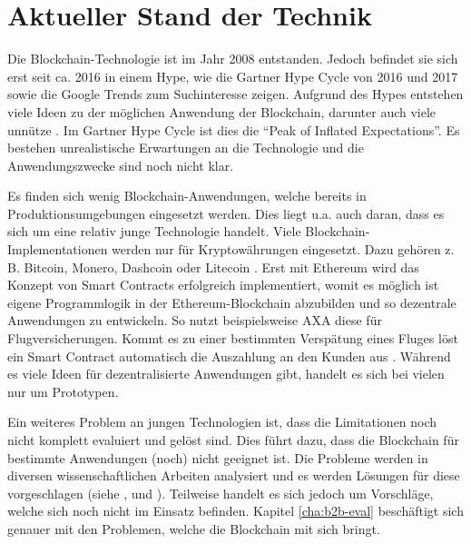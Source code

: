 \chapter{Aktueller Stand der Technik}
\label{cha:stand-technik}

Die Blockchain-Technologie ist im Jahr 2008 entstanden. Jedoch befindet sie sich erst seit ca. 2016 in einem Hype, wie die Gartner Hype Cycle von 2016 und 2017 \cite{PanettaTopTrendsGartner2017}\cite{AmyGartner2016Hype2016} sowie die Google Trends zum Suchinteresse \cite{GoogleBlockchainGoogleTrends18} zeigen. Aufgrund des Hypes entstehen viele Ideen zu der möglichen Anwendung der Blockchain, darunter auch viele unnütze \cite{WustyouneedBlockchain2017}. Im Gartner Hype Cycle ist dies die ``Peak of Inflated Expectations''. Es bestehen unrealistische Erwartungen an die Technologie und die Anwendungszwecke sind noch nicht klar. 

Es finden sich wenig Blockchain-Anwendungen, welche bereits in Produktionsumgebungen eingesetzt werden. Dies liegt u.a. auch daran, dass es sich um eine relativ junge Technologie handelt. Viele Blockchain-Implementationen werden nur für Kryptowährungen eingesetzt. Dazu gehören z. B. Bitcoin, Monero, Dashcoin oder Litecoin \cite{BlockchainHubBlockchainsDistributedLedger}. Erst mit Ethereum wird das Konzept von Smart Contracts erfolgreich implementiert, womit es möglich ist eigene Programmlogik in der Ethereum-Blockchain abzubilden und so dezentrale Anwendungen zu entwickeln. So nutzt beispielsweise AXA diese für Flugversicherungen. Kommt es zu einer bestimmten Verspätung eines Fluges löst ein Smart Contract automatisch die Auszahlung an den Kunden aus \cite{BoerAXAnutztEthereumBlockchain2017}. Während es viele Ideen für dezentralisierte Anwendungen gibt, handelt es sich bei vielen nur um Prototypen.

Ein weiteres Problem an jungen Technologien ist, dass die Limitationen noch nicht komplett evaluiert und gelöst sind. Dies führt dazu, dass die Blockchain für bestimmte Anwendungen (noch) nicht geeignet ist. Die Probleme werden in diversen wissenschaftlichen Arbeiten analysiert und es werden Lösungen für diese vorgeschlagen (siehe \cite{ZhengBlockchainChallengesOpportunities2017}, \cite[S.~84]{SwanBlockchainblueprintnew2015} und \cite{SchererPerformanceScalabilityBlockchain2017}). Teilweise handelt es sich jedoch um Vorschläge, welche sich noch nicht im Einsatz befinden. Kapitel \ref{cha:b2b-eval} beschäftigt sich genauer mit den Problemen, welche die Blockchain mit sich bringt.

